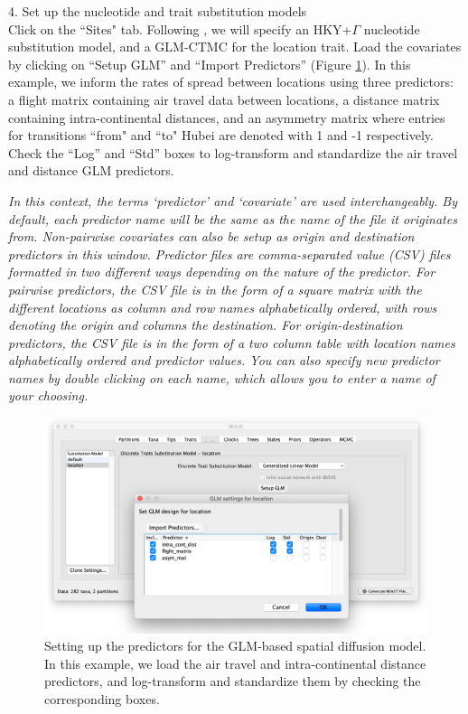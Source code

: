 \documentclass{article}
\newcommand{\ann}[1]{
\begin{adjustwidth}{0.5cm}{}
\it{#1}\\
\end{adjustwidth}}
\begin{document}
\clearpage

4. Set up the nucleotide and trait substitution models\\

Click on the ``Sites" tab. Following \cite{travhist}, we will specify an HKY+$\Gamma$ nucleotide substitution model, and a GLM-CTMC for the location trait.
Load the covariates by clicking on ``Setup GLM'' and ``Import Predictors'' (Figure \ref{fig:GLM}). In this example, we inform the rates of spread between locations using three predictors: a flight matrix containing air travel data between locations, a distance matrix containing intra-continental distances, and an asymmetry matrix where entries for transitions ``from" and ``to" Hubei are denoted with 1 and -1 respectively.
Check the ``Log'' and ``Std'' boxes to log-transform and standardize the air travel and distance GLM predictors.\\

\ann{In this context, the terms `predictor' and `covariate' are used interchangeably.
By default, each predictor name will be the same as the name of the file it originates from. Non-pairwise covariates can also be setup as origin and destination predictors in this window. Predictor files are comma-separated value (CSV) files formatted in two different ways depending on the nature of the predictor. For pairwise predictors, the CSV file is in the form of a square matrix with the different locations as column and row names alphabetically ordered, with rows denoting the origin and columns the destination. For origin-destination predictors, the CSV file is in the form of a two column table with location names alphabetically ordered and predictor values.
You can also specify new predictor names by double clicking on each name, which allows you to enter a name of your choosing.
}

\begin{figure}[!ht]
    \centering
    \includegraphics[width=1.0\textwidth]{figs/GLM.pdf}
    \caption{Setting up the predictors for the GLM-based spatial diffusion model. In this example, we load the air travel and intra-continental distance predictors, and log-transform and standardize them by checking the corresponding boxes.}
    \label{fig:GLM}
\end{figure}
\end{document}
